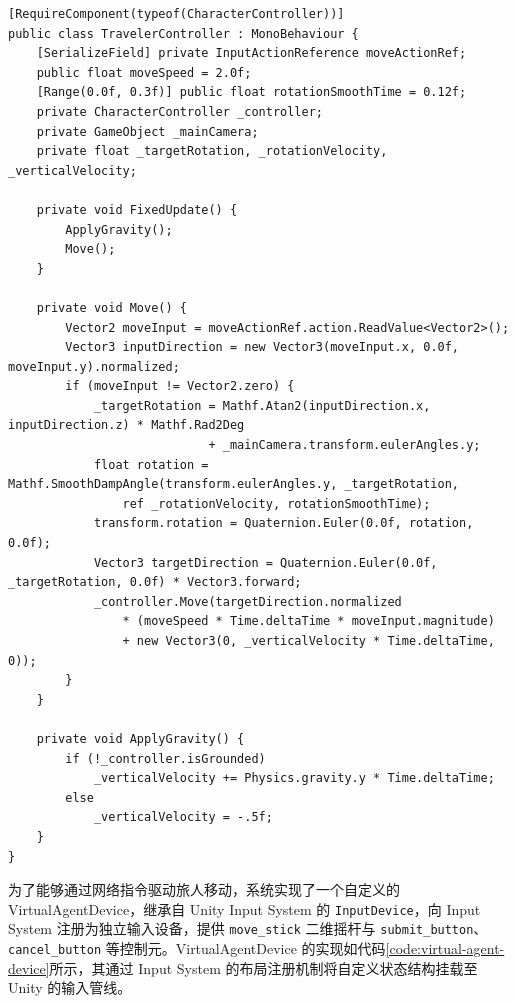 \documentclass[bachelor]{njupthesis}
\begin{document}
\begin{code}
\caption{TravelerController 核心移动逻辑}
\label{code:traveler-controller}
\lstset{style=codeblock}
\begin{lstlisting}
[RequireComponent(typeof(CharacterController))]
public class TravelerController : MonoBehaviour {
    [SerializeField] private InputActionReference moveActionRef;
    public float moveSpeed = 2.0f;
    [Range(0.0f, 0.3f)] public float rotationSmoothTime = 0.12f;
    private CharacterController _controller;
    private GameObject _mainCamera;
    private float _targetRotation, _rotationVelocity, _verticalVelocity;

    private void FixedUpdate() {
        ApplyGravity();
        Move();
    }

    private void Move() {
        Vector2 moveInput = moveActionRef.action.ReadValue<Vector2>();
        Vector3 inputDirection = new Vector3(moveInput.x, 0.0f, moveInput.y).normalized;
        if (moveInput != Vector2.zero) {
            _targetRotation = Mathf.Atan2(inputDirection.x, inputDirection.z) * Mathf.Rad2Deg
                            + _mainCamera.transform.eulerAngles.y;
            float rotation = Mathf.SmoothDampAngle(transform.eulerAngles.y, _targetRotation,
                ref _rotationVelocity, rotationSmoothTime);
            transform.rotation = Quaternion.Euler(0.0f, rotation, 0.0f);
            Vector3 targetDirection = Quaternion.Euler(0.0f, _targetRotation, 0.0f) * Vector3.forward;
            _controller.Move(targetDirection.normalized
                * (moveSpeed * Time.deltaTime * moveInput.magnitude)
                + new Vector3(0, _verticalVelocity * Time.deltaTime, 0));
        }
    }

    private void ApplyGravity() {
        if (!_controller.isGrounded)
            _verticalVelocity += Physics.gravity.y * Time.deltaTime;
        else
            _verticalVelocity = -.5f;
    }
}
\end{lstlisting}
\end{code}

为了能够通过网络指令驱动旅人移动，系统实现了一个自定义的 VirtualAgentDevice，继承自 Unity Input System 的 \texttt{InputDevice}，向 Input System 注册为独立输入设备，提供 \texttt{move\_stick} 二维摇杆与 \texttt{submit\_button}、\texttt{cancel\_button} 等控制元。VirtualAgentDevice 的实现如代码\ref{code:virtual-agent-device}所示，其通过 Input System 的布局注册机制将自定义状态结构挂载至 Unity 的输入管线。
\end{document}
